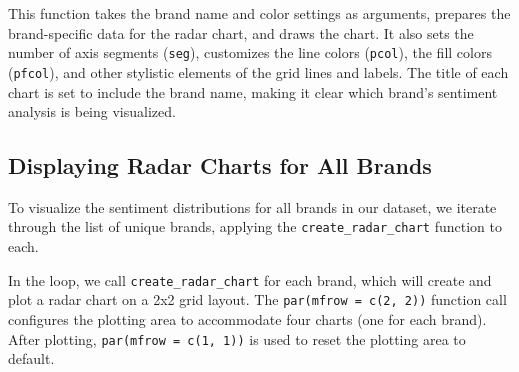 \documentclass[
]{book}
\newenvironment{Shaded}{\begin{snugshade}}{\end{snugshade}}
\newcommand{\AttributeTok}[1]{\textcolor[rgb]{0.13,0.29,0.53}{#1}}
\newcommand{\CommentTok}[1]{\textcolor[rgb]{0.56,0.35,0.01}{\textit{#1}}}
\newcommand{\ControlFlowTok}[1]{\textcolor[rgb]{0.13,0.29,0.53}{\textbf{#1}}}
\newcommand{\DecValTok}[1]{\textcolor[rgb]{0.00,0.00,0.81}{#1}}
\newcommand{\FunctionTok}[1]{\textcolor[rgb]{0.13,0.29,0.53}{\textbf{#1}}}
\newcommand{\NormalTok}[1]{#1}
\newcommand{\OtherTok}[1]{\textcolor[rgb]{0.56,0.35,0.01}{#1}}
\newcommand{\SpecialCharTok}[1]{\textcolor[rgb]{0.81,0.36,0.00}{\textbf{#1}}}
\begin{document}
This function takes the brand name and color settings as arguments, prepares the brand-specific data for the radar chart, and draws the chart. It also sets the number of axis segments (\texttt{seg}), customizes the line colors (\texttt{pcol}), the fill colors (\texttt{pfcol}), and other stylistic elements of the grid lines and labels. The title of each chart is set to include the brand name, making it clear which brand's sentiment analysis is being visualized.

\hypertarget{displaying-radar-charts-for-all-brands}{%
\subsection*{Displaying Radar Charts for All Brands}\label{displaying-radar-charts-for-all-brands}}

To visualize the sentiment distributions for all brands in our dataset, we iterate through the list of unique brands, applying the \texttt{create\_radar\_chart} function to each.

\begin{Shaded}
\end{Shaded}

In the loop, we call \texttt{create\_radar\_chart} for each brand, which will create and plot a radar chart on a 2x2 grid layout. The \texttt{par(mfrow\ =\ c(2,\ 2))} function call configures the plotting area to accommodate four charts (one for each brand). After plotting, \texttt{par(mfrow\ =\ c(1,\ 1))} is used to reset the plotting area to default.
\end{document}
